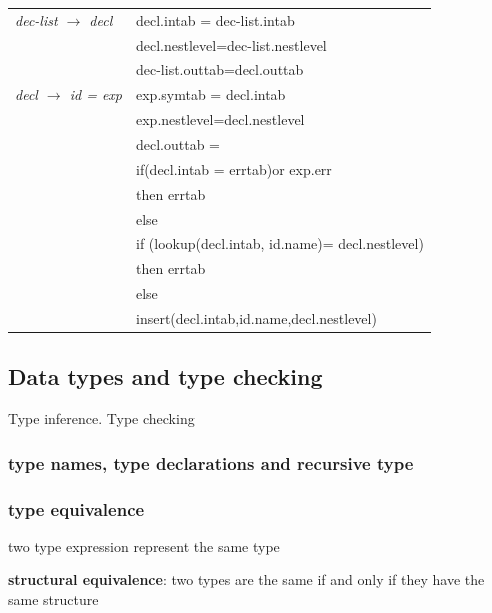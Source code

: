 \documentclass[11pt]{article}
\begin{document}
\begin{center}
\begin{tabular}{ll}
\hline
\emph{dec-list \(\to\) decl} & decl.intab = dec-list.intab\\
 & decl.nestlevel=dec-list.nestlevel\\
 & dec-list.outtab=decl.outtab\\
\hline
\emph{decl \(\to\) id = exp} & exp.symtab = decl.intab\\
 & exp.nestlevel=decl.nestlevel\\
 & decl.outtab =\\
 & if(decl.intab = errtab)or exp.err\\
 & then errtab\\
 & else\\
 & if (lookup(decl.intab, id.name)= decl.nestlevel)\\
 & then errtab\\
 & else\\
 & insert(decl.intab,id.name,decl.nestlevel)\\
\end{tabular}
\end{center}
\rmfamily

\subsection{Data types and type checking}
\label{sec:org646319b}
Type inference. Type checking

\subsubsection{type names, type declarations and recursive type}
\label{sec:orgb5a0b5d}

\subsubsection{type equivalence}
\label{sec:org75c9f9e}
two type expression represent the same type

\textbf{structural equivalence}: two types are the same if and only if they have the same structure
\end{document}
